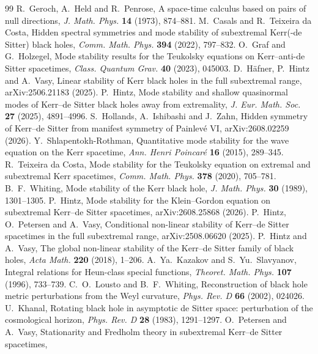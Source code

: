 \documentclass[11pt]{amsart}
\theoremstyle{definition}
\theoremstyle{remark}
\numberwithin{equation}{section}
\begin{document}
\begin{thebibliography}{99}
 R.~Geroch, A.~Held and R.~Penrose, A space-time calculus based on pairs of null directions,
\emph{J. Math. Phys.} \textbf{14} (1973), 874--881.
 M.~Casals and R.~Teixeira da Costa, Hidden spectral symmetries and mode stability of subextremal
Kerr(-de Sitter) black holes, \emph{Comm. Math. Phys.} \textbf{394} (2022), 797--832.
 O.~Graf and G.~Holzegel, Mode stability results for the Teukolsky equations on Kerr--anti-de Sitter
spacetimes, \emph{Class. Quantum Grav.} \textbf{40} (2023), 045003.
 D.~H\"afner, P.~Hintz and A.~Vasy, Linear stability of Kerr black holes in the full subextremal
range, arXiv:2506.21183 (2025).
 P.~Hintz, Mode stability and shallow quasinormal modes of Kerr--de Sitter black holes away from
extremality, \emph{J. Eur. Math. Soc.} \textbf{27} (2025), 4891--4996.
 S.~Hollands, A.~Ishibashi and J.~Zahn, Hidden symmetry of Kerr--de Sitter from manifest symmetry of
Painlev\'e VI, arXiv:2608.02259 (2026).
 Y.~Shlapentokh-Rothman, Quantitative mode stability for the wave equation on the Kerr spacetime,
\emph{Ann. Henri Poincar\'e} \textbf{16} (2015), 289--345.
 R.~Teixeira da Costa, Mode stability for the Teukolsky equation on extremal and subextremal Kerr
spacetimes, \emph{Comm. Math. Phys.} \textbf{378} (2020), 705--781.
 B.~F.~Whiting, Mode stability of the Kerr black hole, \emph{J. Math. Phys.} \textbf{30} (1989),
1301--1305.
 P.~Hintz, Mode stability for the Klein--Gordon equation on subextremal Kerr--de Sitter spacetimes,
arXiv:2608.25868 (2026).
 P.~Hintz, O.~Petersen and A.~Vasy, Conditional non-linear stability of Kerr--de Sitter spacetimes in
the full subextremal range, arXiv:2508.06620 (2025).
 P.~Hintz and A.~Vasy, The global non-linear stability of the Kerr--de Sitter family of black holes,
\emph{Acta Math.} \textbf{220} (2018), 1--206.
 A.~Ya.~Kazakov and S.~Yu.~Slavyanov, Integral relations for Heun-class special functions,
\emph{Theoret. Math. Phys.} \textbf{107} (1996), 733--739.
 C.~O.~Lousto and B.~F.~Whiting, Reconstruction of black hole metric perturbations from the Weyl
curvature, \emph{Phys. Rev. D} \textbf{66} (2002), 024026.
 U.~Khanal, Rotating black hole in asymptotic de Sitter space: perturbation of the cosmological
horizon, \emph{Phys. Rev. D} \textbf{28} (1983), 1291--1297.
 O.~Petersen and A.~Vasy, Stationarity and Fredholm theory in subextremal Kerr--de Sitter spacetimes,

\end{thebibliography}
\end{document}
